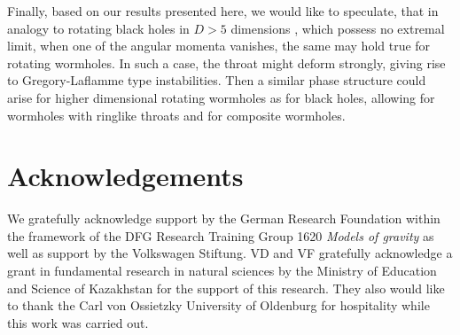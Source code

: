 \documentclass[showpacs,preprintnumbers,amsmath,amssymb,floatfix]{revtex4}
\begin{document}
Finally, based on our results presented here, we would like to speculate,
that in analogy to rotating black holes in $D>5$ dimensions
\cite{Emparan:2008eg},
which possess no extremal limit, when one of the angular momenta vanishes, 
the same may hold true for rotating wormholes.
In such a case, the throat might deform strongly,
giving rise to Gregory-Laflamme type instabilities.
Then a similar phase structure could arise
for higher dimensional rotating wormholes
as for black holes, allowing for wormholes with ringlike
throats and for composite wormholes.






\section*{Acknowledgements}

We gratefully acknowledge support by the German Research Foundation  
within the framework of the DFG Research Training Group 1620 
{\it Models of gravity}
as well as support by the Volkswagen Stiftung. 
VD and VF 
gratefully acknowledge a grant in fundamental research in natural sciences 
by the Ministry of Education and Science of Kazakhstan 
for the support of this research. 
They also would like to thank the Carl von Ossietzky University of Oldenburg 
for hospitality while this work was carried out.
\end{document}
